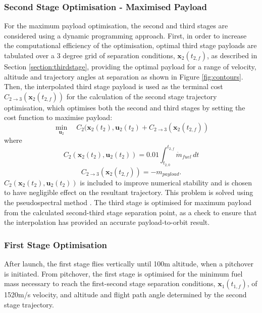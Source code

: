 \documentclass[]{aiaa-tc}
\begin{document}
	 	 \subsubsection{Second Stage Optimisation - Maximised Payload}
	 For the maximum payload optimisation, the second and third stages are considered using a dynamic programming approach. First, in order to increase the computational efficiency of the optimisation, optimal third stage payloads are tabulated  over a 3 degree grid of separation conditions, $\textbf{x}_2(t_{2,f})$, as described in Section \ref{section:thirdstage}, providing the optimal payload for a range of velocity, altitude and trajectory angles at separation as shown in Figure \ref{fig:contours}. Then, the interpolated third stage payload is used as the terminal cost $C_{2 \rightarrow 3}(\textbf{x}_2(t_{2,f}))$ for the calculation of the second stage trajectory optimisation, which optimises both the second and third stages by setting the cost function to maximise payload:
	  \begin{equation}
	  \min\limits_{\textbf{u}_2} \quad C_2(\textbf{x}_{2}(t_2),\textbf{u}_{2}(t_2) + C_{2 \rightarrow 3}(\textbf{x}_2 (t_{2,f}))
	  \end{equation}
	  where
	  \begin{equation}
	  C_2(\textbf{x}_{2}(t_2),\textbf{u}_{2}(t_2)) = 0.01\int_{t_{2,0}}^{t_{2,f}}\dot{m}_{fuel} \, dt
	  \end{equation}
	  \begin{equation}
	  C_{2 \rightarrow 3}(\textbf{x}_2(t_{2,f})) = -m_{payload}.
	  \end{equation}
	   $C_{2}(\textbf{x}_{2}(t_2),\textbf{u}_{2}(t_2))$ is included to improve numerical stability and is chosen to have negligible effect on the resultant trajectory.
	 This problem is solved using the pseudospectral method \cite{Ross2004}. 
	 The third stage is optimised for maximum payload from the calculated second-third stage separation point, as a check to ensure that the interpolation has provided an accurate payload-to-orbit result. 
	 
  

\subsubsection{First Stage Optimisation}
After launch, the first stage flies vertically until 100m altitude, when a pitchover is initiated. 
From pitchover, the first stage is optimised for the minimum fuel mass necessary to reach the first-second stage separation conditions, $\textbf{x}_1(t_{1,f})$, of 1520m/s velocity, and altitude and flight path angle determined by the second stage trajectory. 
\end{document}
